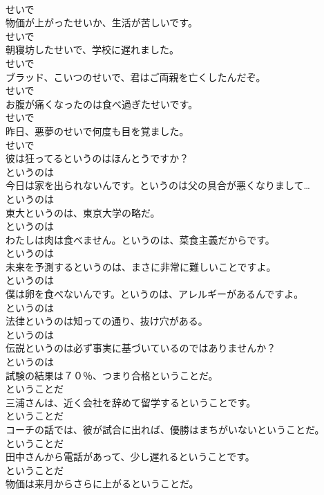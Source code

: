 \documentclass[8pt]{extreport}
\begin{document}
\begin{CJK}{UTF8}{min}
\\	せいで
\\	物価が上がったせいか、生活が苦しいです。	
\\	せいで
\\	朝寝坊したせいで、学校に遅れました。	
\\	せいで
\\	ブラッド、こいつのせいで、君はご両親を亡くしたんだぞ。	
\\	せいで
\\	お腹が痛くなったのは食べ過ぎたせいです。	
\\	せいで
\\	昨日、悪夢のせいで何度も目を覚ました。	
\\	せいで
\\	彼は狂ってるというのはほんとうですか？	
\\	というのは
\\	今日は家を出られないんです。というのは父の具合が悪くなりまして…	
\\	というのは
\\	東大というのは、東京大学の略だ。	
\\	というのは
\\	わたしは肉は食べません。というのは、菜食主義だからです。	
\\	というのは
\\	未来を予測するというのは、まさに非常に難しいことですよ。	
\\	というのは
\\	僕は卵を食べないんです。というのは、アレルギーがあるんですよ。	
\\	というのは
\\	法律というのは知っての通り、抜け穴がある。	
\\	というのは
\\	伝説というのは必ず事実に基づいているのではありませんか？	
\\	というのは
\\	試験の結果は７０％、つまり合格ということだ。	
\\	ということだ
\\	三浦さんは、近く会社を辞めて留学するということです。	
\\	ということだ
\\	コーチの話では、彼が試合に出れば、優勝はまちがいないということだ。	
\\	ということだ
\\	田中さんから電話があって、少し遅れるということです。	
\\	ということだ
\\	物価は来月からさらに上がるということだ。	

\end{CJK}
\end{document}
